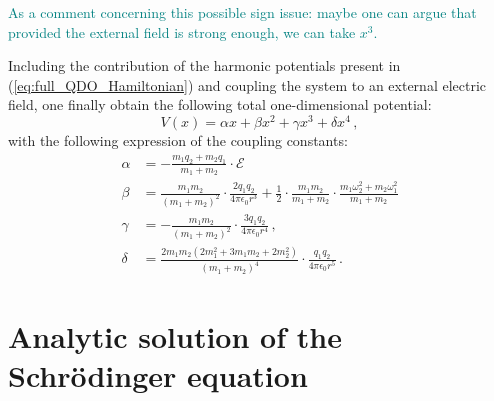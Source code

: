 \documentclass[reprint, amsmath, amssymb, aps, prl]{revtex4-2}
\begin{document}
        \textcolor{teal}{As a comment concerning this possible sign issue: maybe one can argue that provided the external field is strong enough, we can take $x^3$.}

        Including the contribution of the harmonic potentials present in (\ref{eq:full_QDO_Hamiltonian}) and coupling the system to an external electric field, one finally obtain the following total one-dimensional potential:
        \begin{equation}
        \label{eq:quartic_potential}
            V(x) = \alpha x + \beta x^2 + \gamma x^3 + \delta x^4 \,,
        \end{equation}
        with the following expression of the coupling constants:
        \begin{subequations}
        \label{eq:coupling_constants}
        \begin{align}
            \alpha &= -\frac{m_1 q_2 + m_2 q_1}{m_1+m_2}\cdot \mathcal E\\
            \beta &= \frac{m_1m_2}{(m_1+m_2)^2}\cdot\frac{2q_1 q_2}{4\pi\epsilon_0r^3} + \frac{1}{2}\cdot\frac{m_1m_2}{m_1+m_2}\cdot\frac{m_1\omega_2^2+m_2\omega_1^2}{m_1+m_2}\\
            \gamma&=-\frac{m_1m_2}{(m_1+m_2)^2}\cdot\frac{3 q_1 q_2}{4\pi\epsilon_0r^4}\,,\\
            \delta&=\frac{2m_1m_2(2m_1^2+3m_1m_2+2m_2^2)}{(m_1+m_2)^4}\cdot\frac{q_1 q_2}{4\pi\epsilon_0r^5}\,.
        \end{align}
        \end{subequations}

\section{Analytic solution of the Schr\"odinger equation}
\end{document}
